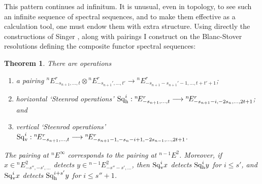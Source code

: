 \documentclass[11pt]{article}
\theoremstyle{plain}
\newtheorem{theorem}{Theorem}
\renewcommand*{\thetheorem}{\Alph{theorem}}
\newcommand{\Sq}{\mathrm{Sq}}
\begin{document}



This pattern continues ad infinitum. It is unusual, even in topology, to see such an infinite sequence of spectral sequences, and to make them effective as a calculation tool, one must endow them with extra structure. Using directly the constructions of Singer \cite{SingerSteen1.pdf}, along with pairings I construct on the Blanc-Stover resolutions defining the composite functor spectral sequences:
{
\renewcommand{\thetheorem}{\ref{CompFuncMasterDiag}.2}
\begin{theorem}
There are operations
\begin{enumerate}\squishlist
\setlength{\parindent}{.25in}
\item a pairing ${^{n\!}}E^r_{-s_{n+1},\ldots,t}\otimes {^{n\!}}E^r_{-s_{n+1}',\ldots,t'}\to {^{n\!}}E^r_{-s_{n+1}-s_{n+1}'-1,\ldots,t+t'+1}$;
\item horizontal `Steenrod operations' ${\Sq}^i_\textup{h}:{^{n\!}}E^r_{-s_{n+1},\ldots,t}\to {^{n\!}}E^r_{-s_{n+1}-i,-2s_{n},\ldots,2t+1}$; and
\item vertical `Steenrod operations' ${\Sq}^i_\textup{v}:{^{n\!}}E^r_{-s_{n+1},\ldots,t}\to {^{n\!}}E^r_{-s_{n+1}-1,-s_{n}-i+1,-2s_{n-1},\ldots,2t+1}$.
\end{enumerate}
The pairing at ${^{n\!}}E^\infty$ corresponds to the pairing at ${^{n-1\!}}E^2$. Moreover, if $x\in {^{n\!}}E^2_{-s'',-s',\ldots}$ detects $y\in {^{n-1\!}}E^2_{-s''-s',\ldots}$, then $\Sq_\textup{v}^ix$ detects $\Sq_\textup{h}^iy$ for $i\leq s'$, and $\Sq_\textup{v}^ix$ detects $\Sq_\textup{h}^{i+s'}y$ for $i\leq s''+1$.
\end{theorem}
}
\end{document}
